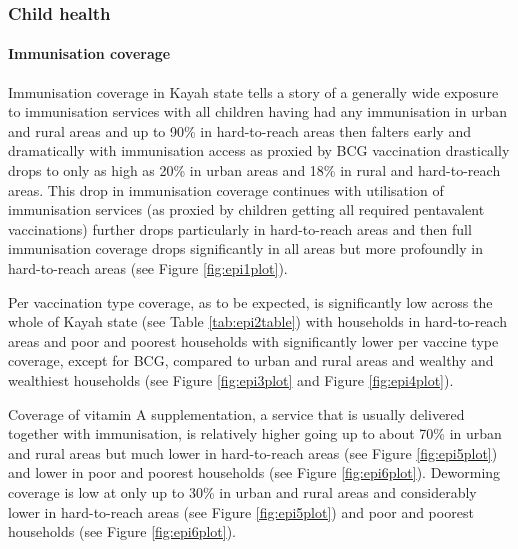 \documentclass[12pt,a4paper]{article}
\let\oldparagraph\paragraph
\renewcommand{\paragraph}[1]{\oldparagraph{#1}\mbox{}}
\begin{document}
\hypertarget{chealth-results}{%
\subsubsection{Child health}\label{chealth-results}}

\hypertarget{epi-results}{%
\paragraph{Immunisation coverage}\label{epi-results}}

Immunisation coverage in Kayah state tells a story of a generally wide exposure to immunisation services with all children having had any immunisation in urban and rural areas and up to 90\% in hard-to-reach areas then falters early and dramatically with immunisation access as proxied by BCG vaccination drastically drops to only as high as 20\% in urban areas and 18\% in rural and hard-to-reach areas. This drop in immunisation coverage continues with utilisation of immunisation services (as proxied by children getting all required pentavalent vaccinations) further drops particularly in hard-to-reach areas and then full immunisation coverage drops significantly in all areas but more profoundly in hard-to-reach areas (see Figure \ref{fig:epi1plot}).

Per vaccination type coverage, as to be expected, is significantly low across the whole of Kayah state (see Table \ref{tab:epi2table}) with households in hard-to-reach areas and poor and poorest households with significantly lower per vaccine type coverage, except for BCG, compared to urban and rural areas and wealthy and wealthiest households (see Figure \ref{fig:epi3plot} and Figure \ref{fig:epi4plot}).

Coverage of vitamin A supplementation, a service that is usually delivered together with immunisation, is relatively higher going up to about 70\% in urban and rural areas but much lower in hard-to-reach areas (see Figure \ref{fig:epi5plot}) and lower in poor and poorest households (see Figure \ref{fig:epi6plot}). Deworming coverage is low at only up to 30\% in urban and rural areas and considerably lower in hard-to-reach areas (see Figure \ref{fig:epi5plot}) and poor and poorest households (see Figure \ref{fig:epi6plot}).
\end{document}
